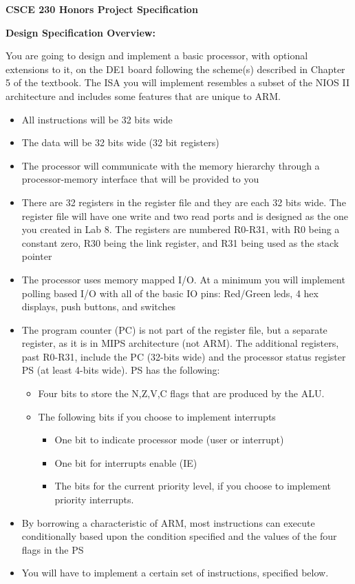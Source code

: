 \documentclass[]{article}
\begin{document}
\begin{center}
	{\LARGE
		\textbf{
		CSCE 230 Honors Project Specification
		}
	}
\end{center}

{\Large
	\textbf{
		Design Specification Overview:
	}
}

\noindent You are going to design and implement a basic processor, with optional extensions to it, on the DE1 board following the scheme(s) described in Chapter 5 of the textbook.  The ISA you will implement resembles a subset of the NIOS II architecture and includes some features that are unique to ARM.

\begin{center}
	\begin{itemize}
		\item All instructions will be 32 bits wide
		\item The data will be 32 bits wide (32 bit registers)
		\item The processor will communicate with the memory hierarchy through a processor-memory interface that will be provided to you
		\item There are 32 registers in the register file and they are each 32 bits wide.  The register file will have one write and two read ports and is designed as the one you created in Lab 8.  The registers are numbered R0-R31, with R0 being a constant zero, R30 being the link register, and R31 being used as the stack pointer
		\item The processor uses memory mapped I/O.  At a minimum you will implement polling based I/O with all of the basic IO pins: Red/Green leds, 4 hex displays, push buttons, and switches
		\item The program counter (PC) is not part of the register file, but a separate register, as it is in MIPS architecture (not ARM).  The additional registers, past R0-R31, include the PC (32-bits wide) and the processor status register PS (at least 4-bits wide).  PS has the following:
			\begin{itemize}
				\item Four bits to store the N,Z,V,C flags that are produced by the ALU.
				\item The following bits if you choose to implement interrupts
					\begin{itemize}
						\item One bit to indicate processor mode (user or interrupt)
						\item One bit for interrupts enable (IE)
						\item The bits for the current priority level, if you choose to implement priority interrupts.
					\end{itemize}
			\end{itemize}
		\item By borrowing a characteristic of ARM, most instructions can execute conditionally based upon the condition specified and the values of the four flags in the PS
		\item You will have to implement a certain set of instructions, specified below.
	\end{itemize}
\end{center}
\pagebreak
\end{document}
